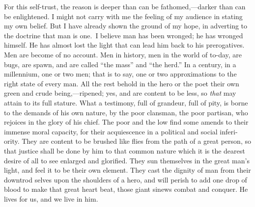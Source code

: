 
For this self-trust, the reason is deeper than can be
fath\-omed,---dark\-er than can be enlightened. I might not carry with
me the feeling of my audience in stating my own belief. But I have
already shown the ground of my hope, in adverting to the doctrine that
man is one. I believe man has been wronged; he has wronged himself. He
has almost lost the light that can lead him back to his prerogatives.
Men are become of no account. Men in history, men in the world of
to-day, are bugs, are spawn, and are called ``the mass'' and ``the
herd.'' In a century, in a millennium, one or two men; that is to say,
one or two approximations to the right state of every man. All the
rest behold in the hero or the poet their own green and crude
be\-ing,---rip\-ened; yes, and are content to be less, so
\textit{that} may attain to its full stature. What a testimony, full
of grandeur, full of pity, is borne to the demands of his own nature,
by the poor clansman, the poor partisan, who rejoices in the glory of
his chief. The poor and the low find some amends to their immense
moral capacity, for their acquiescence in a political and social
inferi-ority. They are content to be brushed like flies from
the path of a great person, so that justice shall be done by him to
that common nature which it is the dearest desire of all to see
enlarged and glorified. They sun themselves in the great man's light,
and feel it to be their own element. They cast the dignity of man from
their downtrod selves upon the shoulders of a hero, and will perish to
add one drop of blood to make that great heart beat, those giant
sinews combat and conquer. He lives for us, and we live in him.

